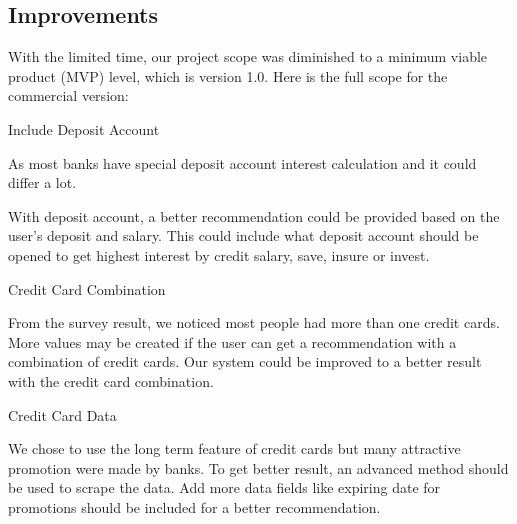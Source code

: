 \subsection{Improvements} %
\label{sub:improvements}

With the limited time, our project scope was diminished to a minimum viable product (MVP) level, which is version 1.0. Here is the full scope for the commercial version:

\begin{description}[align=left]
	\item [version 1.1] Include Deposit Account

		As most banks have special deposit account interest calculation and it could differ a lot.

		With deposit account, a better recommendation could be provided based on the user's deposit and salary. This could include what deposit account should be opened to get highest interest by credit salary, save, insure or invest.


	\item [version 1.2] Credit Card Combination

		From the survey result, we noticed most people had more than one credit cards. More values may be created if the user can get a recommendation with a combination of credit cards. Our system could be improved to a better result with the credit card combination.

	\item [version 1.3] Credit Card Data

		We chose to use the long term feature of credit cards but many attractive promotion were made by banks. To get better result, an advanced method should be used to scrape the data. Add more data fields like expiring date for promotions should be included for a better recommendation.



\end{description}
